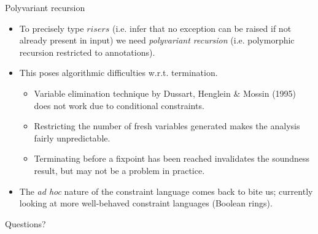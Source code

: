 \documentclass[serif,professionalfont]{beamer}
\newcommand{\Varid}[1]{\mathit{#1}}
\theoremstyle{plain}
\theoremstyle{definition}
\begin{document}
\begin{frame}{Polyvariant recursion}

    \begin{itemize}
    
        \item To precisely type \ensuremath{\Varid{risers}} (i.e. infer that no exception can be raised if not already present in input) we need \emph{polyvariant recursion} (i.e. polymorphic recursion restricted to annotations).
        
        \item This poses algorithmic difficulties w.r.t. termination.
        
            \begin{itemize}
            
                \item Variable elimination technique by Dussart, Henglein \& Mossin (1995) does not work due to conditional constraints.
                
                \item Restricting the number of fresh variables generated makes the analysis fairly unpredictable.
                
                \item Terminating before a fixpoint has been reached invalidates the soundness result, but may not be a problem in practice.
                
            \end{itemize}
            
        \item The \emph{ad hoc} nature of the constraint language comes back to bite us; currently looking at more well-behaved constraint languages (Boolean rings).
    
    \end{itemize}

\end{frame}

\begin{frame}\center

    Questions?

\end{frame}
\end{document}

